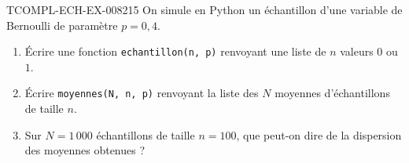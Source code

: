 % 
% 
% 
\begin{exercice}{TCOMPL-ECH-EX-008}{2}{15}
On simule en Python un échantillon d'une variable de Bernoulli de paramètre
$p=0{,}4$.
\begin{enumerate}
  \item Écrire une fonction \texttt{echantillon(n, p)} renvoyant une liste de
        $n$ valeurs $0$ ou $1$.
  \item Écrire \texttt{moyennes(N, n, p)} renvoyant la liste des $N$ moyennes
        d'échantillons de taille $n$.
  \item Sur $N=1\,000$ échantillons de taille $n=100$, que peut-on dire de la
        dispersion des moyennes obtenues ?
\end{enumerate}
\end{exercice}
